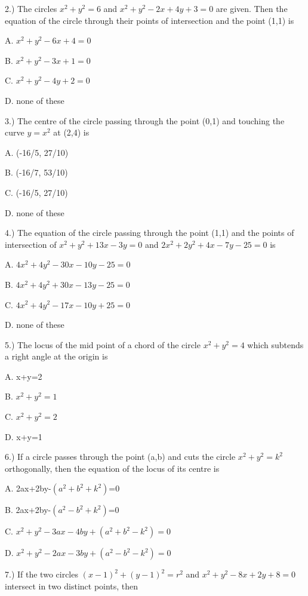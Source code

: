 \documentclass{article}
\begin{document}
\vspace{5mm}
2.) The circles $x^2+y^2=6$ and  $x^2+y^2-2x+4y+3=0$ are given. Then the equation of the circle through their points of intersection and the point (1,1) is

\choice  A. $x^2+y^2-6x+4=0$

\choice  B. $x^2+y^2-3x+1=0$

\choice  C. $x^2+y^2-4y+2=0$

\choice  D. none of these

\vspace{5mm}
3.) The centre of the circle passing through the point (0,1) and touching the curve $y=x^2$ at (2,4) is

\choice  A. (-16/5, 27/10)

\choice  B. (-16/7, 53/10)

\choice  C. (-16/5, 27/10)

\choice  D.  none of these

\vspace{5mm}
4.) The equation of the circle passing through the point (1,1) and the points of intersection of $x^2+y^2+13x-3y=0$ and $2x^2+2y^2+4x-7y-25=0$ is 

\choice  A. $4x^2+4y^2-30x-10y-25=0$

\choice  B. $4x^2+4y^2+30x-13y-25=0$

\choice  C. $4x^2+4y^2-17x-10y+25=0$

\choice  D.  none of these

\vspace{5mm}
5.) The locus of the mid point of a chord of the circle $x^2+y^2=4$ which subtends a right angle at the origin is

\choice  A. x+y=2

\choice  B. $x^2+y^2=1$

\choice  C. $x^2+y^2=2$

\choice  D. x+y=1

\vspace{5mm}
6.) If a circle passes through the point (a,b) and cuts the circle $x^2+y^2=k^2$ orthogonally, then the equation of the locus of its centre is  

\choice  A. 2ax+2by-$(a^2+b^2+k^2)$=0

\choice  B. 2ax+2by-$(a^2-b^2+k^2)$=0

\choice  C. $x^2+y^2-3ax-4by+(a^2+b^2-k^2)=0$

\choice  D. $x^2+y^2-2ax-3by+(a^2-b^2-k^2)=0$

\vspace{5mm}
7.) If the two circles $(x-1)^2+(y-1)^2=r^2$ and $x^2+y^2-8x+2y+8=0$ intersect in two distinct points, then
\end{document}
